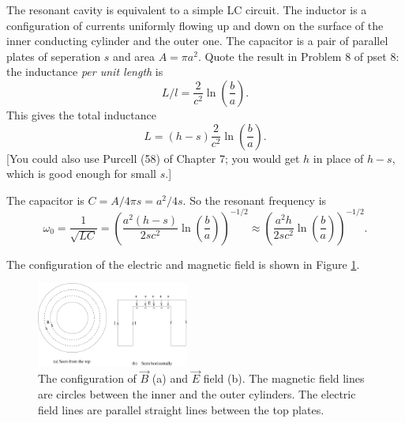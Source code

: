 \documentclass[makesolutionspdf]{esg8022pset}
\begin{document}
\begin{solution}

The resonant cavity is equivalent to a simple LC circuit.  The
inductor is a configuration of currents uniformly flowing up and down 
on the surface of the inner conducting cylinder and the outer one.
The capacitor is a pair of parallel plates of seperation $s$ and area
$A=\pi a^2$.  Quote the result in Problem 8 of pset 8: the inductance
{\sl per unit length} is 
\[ L/l =\frac{2}{c^2}\ln{(\frac{b}{a})}.\]
This gives the total inductance 
\[ L= (h-s)\frac{2}{c^2}\ln{(\frac{b}{a})}.\]
[You could also use Purcell (58) of Chapter 7; you would get $h$ in place of $h-s$, which is good enough 
for small $s$.]

The capacitor is $C= A/4\pi s= a^2/4s$.  So the resonant frequency is
\begin{equation}
\omega_0=\frac{1}{\sqrt{LC}}= \left(\frac{a^2
(h-s)}{2sc^2}\ln(\frac{b}{a})\right)^{-1/2}
\approx  \left(\frac{a^2
h}{2sc^2}\ln(\frac{b}{a})\right)^{-1/2}.
\end{equation}

The configuration of the electric and magnetic field is shown in
Figure \ref{fig:cavity2}.

\begin{figure}[H]
    \centering
    \includegraphics[width = 5cm]{cavity2}
    \caption{The configuration of $\vec{B}$ (a) and $\vec{E}$ field (b).
The magnetic field lines are circles between the inner and the outer
cylinders.  The electric field lines are parallel straight lines
between the top plates.}
    \label{fig:cavity2}
  \end{figure}


\end{solution}
\end{document}

